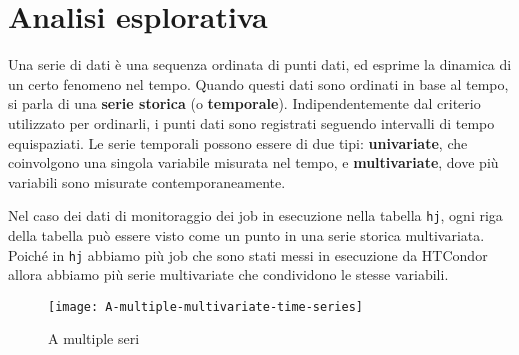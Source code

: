 \label{chap:analisi}
\section{Analisi esplorativa}


\begin{definition}
    Una serie di dati è una sequenza ordinata di punti dati, ed esprime la
    dinamica di un certo fenomeno nel tempo. Quando questi dati sono ordinati
    in base al tempo, si parla di una \textbf{serie storica} (o
    \textbf{temporale}).
    Indipendentemente dal criterio utilizzato per ordinarli, i punti dati sono
    registrati seguendo intervalli di tempo equispaziati. Le serie temporali
    possono essere di due tipi: \textbf{univariate}, che coinvolgono una
    singola variabile misurata nel tempo, e \textbf{multivariate}, dove più
    variabili sono misurate contemporaneamente.
\end{definition}

Nel caso dei dati di monitoraggio dei job in esecuzione nella tabella
\texttt{hj}, ogni riga della tabella può essere visto come un punto in una
serie storica multivariata. Poiché in \texttt{hj} abbiamo più job che sono
stati messi in esecuzione da HTCondor allora abbiamo più serie multivariate
che condividono le stesse variabili.

\begin{figure}[ht]
    \centering
    \texttt{[image: A-multiple-multivariate-time-series]}
    \caption[legenda elenco figure]{A multiple seri}\label{fig:prima}
\end{figure}







